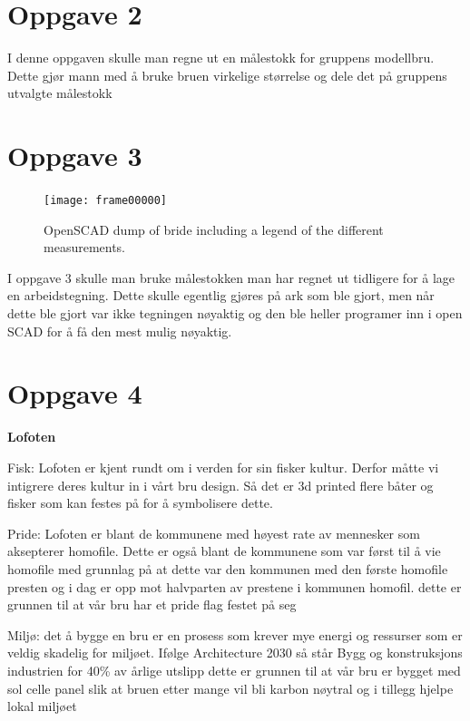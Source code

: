 \documentclass{report}
\begin{document}
\section{Oppgave 2}

I denne oppgaven skulle man regne ut en målestokk for gruppens modellbru. Dette gjør mann med å bruke bruen virkelige størrelse og dele det på gruppens utvalgte målestokk

\section{Oppgave 3}


\begin{figure}[t]
	\centering
	\texttt{[image: frame00000]}

	\caption {OpenSCAD dump of bride including a legend of the different measurements.}
	\label{fig:bridge}
\end{figure}

I oppgave 3 skulle man bruke målestokken man har regnet ut tidligere for å lage en arbeidstegning. Dette skulle egentlig gjøres på ark som ble gjort, men når dette ble gjort var ikke tegningen nøyaktig og den ble heller programer inn i open SCAD for å få den mest mulig nøyaktig.

\section{Oppgave 4}

\textbf {Lofoten}

Fisk: Lofoten er kjent rundt om i verden for sin fisker kultur. Derfor måtte vi intigrere deres kultur in i vårt bru design. Så det er 3d printed flere båter og fisker som kan festes på for å symbolisere dette.

Pride: Lofoten er blant de kommunene med høyest rate av mennesker som aksepterer homofile. Dette er også blant de kommunene som var først til å vie homofile med grunnlag på at dette var den kommunen med den første homofile presten og i dag er opp mot halvparten av prestene i kommunen homofil. dette er grunnen til at vår bru har et pride flag festet på seg

Miljø: det å bygge en bru er en prosess som krever mye energi og ressurser som er veldig skadelig for miljøet. Ifølge Architecture 2030 så står Bygg og konstruksjons industrien for 40\% av årlige utslipp dette er grunnen til at vår bru er bygget med sol celle panel slik at bruen etter mange vil bli karbon nøytral og i tillegg hjelpe lokal miljøet
\end{document}
